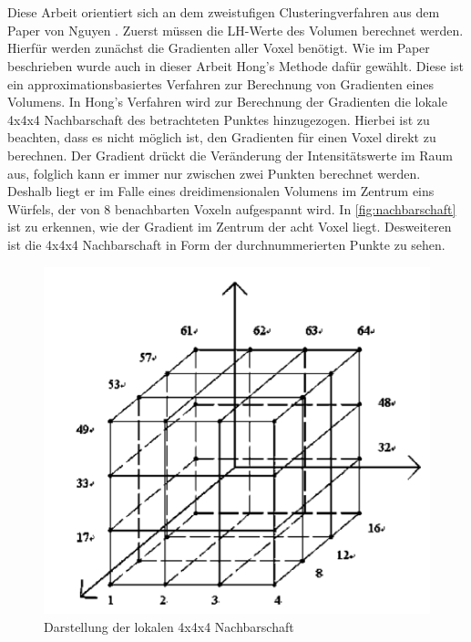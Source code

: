 \chapter{}
\label{sec:methods}


Diese Arbeit orientiert sich an dem zweistufigen Clusteringverfahren aus dem Paper von Nguyen \cite{nguyen2012clustering}. 
\newline
Zuerst müssen die LH-Werte des Volumen berechnet werden. Hierfür werden zunächst die Gradienten aller Voxel benötigt. Wie im Paper beschrieben wurde auch in dieser Arbeit Hong's Methode \cite{hong2003method} dafür gewählt.
Diese ist ein approximationsbasiertes Verfahren zur Berechnung von Gradienten eines Volumens. 
\newline
In Hong's Verfahren wird zur Berechnung der Gradienten die lokale 4x4x4 Nachbarschaft des betrachteten Punktes hinzugezogen. Hierbei ist zu beachten, dass es nicht möglich ist, den Gradienten für einen Voxel direkt zu berechnen. Der Gradient drückt die Veränderung der Intensitätswerte im Raum aus, folglich kann er immer nur zwischen zwei Punkten berechnet werden. Deshalb liegt er im Falle eines dreidimensionalen Volumens im Zentrum eins Würfels, der von 8 benachbarten Voxeln aufgespannt wird. In \autoref{fig:nachbarschaft} ist zu erkennen, wie der Gradient im Zentrum der acht Voxel liegt. Desweiteren ist die 4x4x4 Nachbarschaft in Form der durchnummerierten Punkte zu sehen.
\newline

\begin{figure}[!h] 
\centering 
\includegraphics[width=\textwidth]{Logos/VoxelEdges.PNG}
\caption{Darstellung der lokalen 4x4x4 Nachbarschaft} 
\label{fig:nachbarschaft} 
\end{figure}

